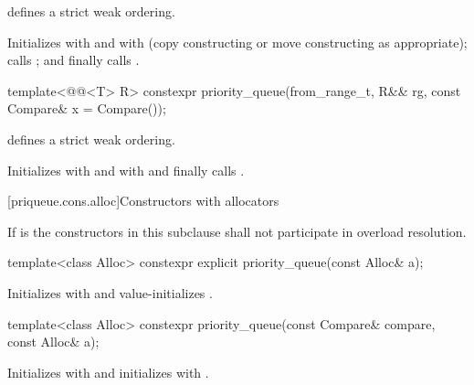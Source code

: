\begin{itemdescr}
\pnum
\expects
{} defines a strict weak ordering.

\pnum
\effects
Initializes
 with
 and
 with
 (copy constructing or move constructing as appropriate);
calls
;
and finally calls
.
\end{itemdescr}

%
\begin{itemdecl}
template<@@<T> R>
  constexpr priority_queue(from_range_t, R&& rg, const Compare& x = Compare());
\end{itemdecl}

\begin{itemdescr}
\pnum
\expects
{} defines a strict weak ordering.

\pnum
\effects
Initializes  with  and
 with  and
finally calls .
\end{itemdescr}

[priqueue.cons.alloc]{Constructors with allocators}

\pnum
If  is 
the constructors in this subclause shall not participate in overload resolution.

%
\begin{itemdecl}
template<class Alloc> constexpr explicit priority_queue(const Alloc& a);
\end{itemdecl}

\begin{itemdescr}
\pnum
\effects
Initializes  with  and value-initializes .
\end{itemdescr}

%
\begin{itemdecl}
template<class Alloc> constexpr priority_queue(const Compare& compare, const Alloc& a);
\end{itemdecl}

\begin{itemdescr}
\pnum
\effects
Initializes  with  and initializes  with .
\end{itemdescr}


